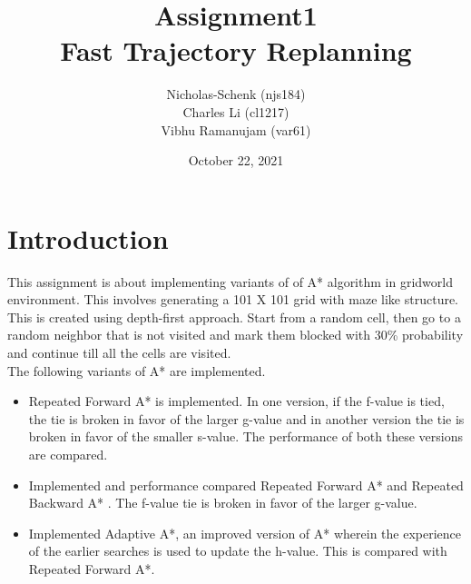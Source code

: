 \documentclass[12pt]{article}
\title{Assignment1 \\
Fast Trajectory Replanning}
\author{Nicholas-Schenk (njs184)\\
Charles Li (cl1217)\\
Vibhu Ramanujam (var61)}
\date{October 22, 2021}
\begin{document}
\maketitle


\newpage



\section*{Introduction}
This assignment is about implementing variants of of A* algorithm in gridworld environment. This involves generating a 101 X 101 grid with maze like structure. This is created using depth-first approach. Start from a random cell, then go to a random neighbor that is not visited and mark them blocked with 30\% probability and continue till all the cells are visited.
\\
The following variants of A* are implemented.
  \begin{itemize}
    \item 
      \begin{flushleft}
        Repeated Forward A* is implemented. In one version, if the f-value is tied, the tie is broken in favor of the larger g-value and in another version the tie is broken in favor of the smaller s-value. The performance of both these versions are compared.
        \end{flushleft}
    \item
		\begin{flushleft}
        Implemented and performance compared Repeated Forward A* and Repeated Backward A* . The f-value tie is broken in favor of the larger g-value.
         \end{flushleft}
     \item
		\begin{flushleft}
        Implemented Adaptive A*, an improved version of A* wherein the experience of the earlier searches is used to update the h-value. This is compared with Repeated Forward A*.
        \end{flushleft}
      
 \end{itemize}
      
\end{document}
